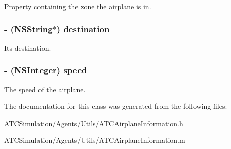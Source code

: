 \label{interface_a_t_c_airplane_information_af795c45df27d97b4194ea6c1f640cf9f}
\-Property containing the zone the airplane is in. \hypertarget{interface_a_t_c_airplane_information_a436971fb85545905060e5a6d46cd4c28}{
\subsubsection[{destination}]{\setlength{\rightskip}{0pt plus 5cm}-\/ (\-N\-S\-String$\ast$) destination}}
\label{interface_a_t_c_airplane_information_a436971fb85545905060e5a6d46cd4c28}
\-Its destination. \hypertarget{interface_a_t_c_airplane_information_a3c51274a6f30a1f0658c6eb2d6f343d6}{
\subsubsection[{speed}]{\setlength{\rightskip}{0pt plus 5cm}-\/ (\-N\-S\-Integer) speed}}
\label{interface_a_t_c_airplane_information_a3c51274a6f30a1f0658c6eb2d6f343d6}
\-The speed of the airplane. 

\-The documentation for this class was generated from the following files\-:\begin{DoxyCompactItemize}
\item 
\-A\-T\-C\-Simulation/\-Agents/\-Utils/\-A\-T\-C\-Airplane\-Information.\-h\item 
\-A\-T\-C\-Simulation/\-Agents/\-Utils/\-A\-T\-C\-Airplane\-Information.\-m\end{DoxyCompactItemize}
